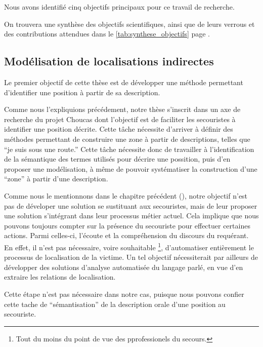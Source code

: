 Nous avons identifié cinq objectifs principaux pour ce travail de
recherche.

On trouvera une synthèse des objectifs scientifiques, ainsi que de
leurs verrous et des contributions attendues dans le
\autoref{tab:synthese_objectifs} page
\pageref{tab:synthese_objectifs}.

\subsection{Modélisation de localisations indirectes}
\label{subsec:2-1-1}

Le premier objectif de cette thèse est de développer une méthode
permettant d'identifier une position à partir de sa
description.

Comme nous l'expliquions précédement, notre thèse s'inscrit dans un
axe de recherche du projet Choucas dont l'objectif est de faciliter
les secouristes à identifier une position décrite. Cette tâche
nécessite d'arriver à définir des méthodes permettant de construire
une zone à partir de descriptions, telles que \enquote{je suis sous
  une route.} Cette tâche nécessite donc de travailler à
l'identification de la sémantique des termes utilisés pour décrire une
possition, puis d'en proposer une modélisation, à même de pouvoir
systématiser la construction d'une \enquote{zone} à partir d'une
description.

Comme nous le mentionnons dans le chapitre précédent (), notre
objectif n'est pas de déveloper une solution se sustituant aux
secouristes, mais de leur proposer une solution s'intégrant dans leur
processus métier actuel. Cela implique que nous pouvons toujours
compter sur la présence du secouriste pour effectuer certaines
actions. Parmi celles-ci, l'écoute et la compréhension du discours du
requérant. En effet, il n'est pas nécessaire, voire souhaitable
\footnote{Tout du moins du point de vue des pprofessionels du
  secours.}, d'automatiser entièrement le processus de localisation de
la victime. Un tel objectif nécessiterait par ailleurs de développer
des solutions d'analyse automatisée du langage parlé, en vue d'en
extraire les relations de localisation.

Cette étape n'est pas nécessaire dans notre cas, puisque nous pouvons
confier cette tache de \enquote{sémantisation} de la description orale
d'une position au secouriste. 

